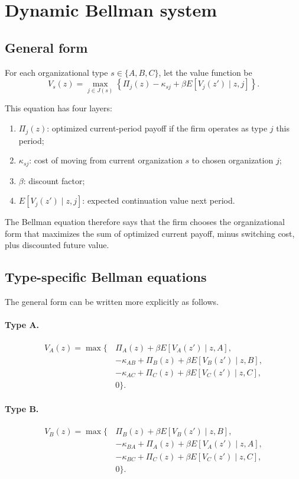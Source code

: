 \documentclass[12pt,fontset=none]{ctexart}
\begin{document}
\section{Dynamic Bellman system}

\subsection{General form}

For each organizational type $s\in\{A,B,C\}$, let the value function be
\[
V_s(z)=
\max_{j\in J(s)}
\left\{
\Pi_j(z)-\kappa_{sj}
+\beta E[V_j(z')\mid z,j]
\right\}.
\]

This equation has four layers:

\begin{enumerate}[leftmargin=2em]
    \item \(\Pi_j(z)\): optimized current-period payoff if the firm operates as type \(j\) this period;
    \item \(\kappa_{sj}\): cost of moving from current organization \(s\) to chosen organization \(j\);
    \item \(\beta\): discount factor;
    \item \(E[V_j(z')\mid z,j]\): expected continuation value next period.
\end{enumerate}

The Bellman equation therefore says that the firm chooses the organizational form
that maximizes the sum of optimized current payoff, minus switching cost, plus discounted
future value.

\subsection{Type-specific Bellman equations}

The general form can be written more explicitly as follows.

\paragraph{Type A.}
\[
\begin{aligned}
V_A(z)=\max\bigl\{\,&\Pi_A(z)+\beta E[V_A(z')\mid z,A],\\
&-\kappa_{AB}+\Pi_B(z)+\beta E[V_B(z')\mid z,B],\\
&-\kappa_{AC}+\Pi_C(z)+\beta E[V_C(z')\mid z,C],\\
&0\bigr\}.
\end{aligned}
\]

\paragraph{Type B.}
\[
\begin{aligned}
V_B(z)=\max\bigl\{\,&\Pi_B(z)+\beta E[V_B(z')\mid z,B],\\
&-\kappa_{BA}+\Pi_A(z)+\beta E[V_A(z')\mid z,A],\\
&-\kappa_{BC}+\Pi_C(z)+\beta E[V_C(z')\mid z,C],\\
&0\bigr\}.
\end{aligned}
\]
\end{document}
